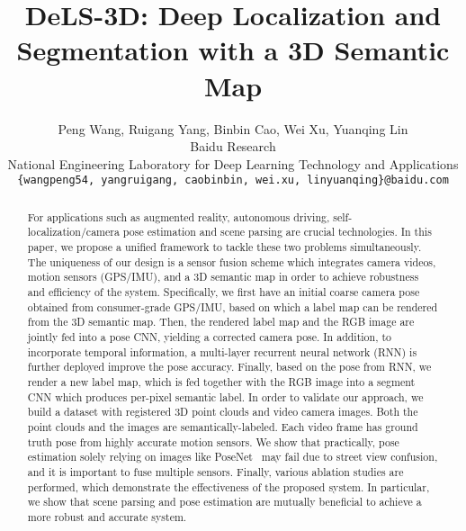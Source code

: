 \documentclass[10pt,twocolumn,letterpaper]{article}
\begin{document}
\title{DeLS-3D: Deep Localization and Segmentation with a 3D Semantic Map}


\author{Peng Wang, Ruigang Yang, Binbin Cao, Wei Xu, Yuanqing Lin\\
Baidu Research \\
National Engineering Laboratory for Deep Learning Technology and Applications\\
{\tt\small \{wangpeng54, yangruigang, caobinbin, wei.xu, linyuanqing\}@baidu.com}}

\maketitle

\begin{abstract}
For applications such as augmented reality, autonomous driving, self-localization/camera pose estimation and scene parsing are crucial technologies. In this paper, we propose a unified framework to tackle these two problems simultaneously. The uniqueness of our design is a sensor fusion scheme which integrates camera videos, motion sensors (GPS/IMU), and a 3D semantic map in order to achieve robustness and efficiency of the system. 
Specifically, we first have an initial coarse camera pose obtained from consumer-grade GPS/IMU, based on which a label map can be rendered from the 3D semantic map. Then, the rendered label map and the RGB image are jointly fed into a pose CNN, yielding a corrected camera pose.
In addition, to incorporate temporal information, a multi-layer recurrent neural network (RNN) is further deployed improve the pose accuracy.
Finally, based on the pose from RNN, we render a new label map, which is fed together with the RGB image into a segment CNN which produces per-pixel semantic label.
In order to validate our approach, we build a dataset with registered 3D point clouds and video camera images. Both the point clouds and the images are semantically-labeled. Each video frame has ground truth pose from highly accurate motion sensors.
We show that practically, pose estimation solely relying on images like PoseNet~\cite{Kendall_2015_ICCV} may fail due to street view confusion, and it is important to fuse multiple sensors. Finally, various ablation studies are performed, which demonstrate the effectiveness of the proposed system. In particular, we show that scene parsing and pose estimation are mutually beneficial to achieve a more robust and accurate system.
\end{abstract}
\vspace{-0.5\baselineskip}
\end{document}

